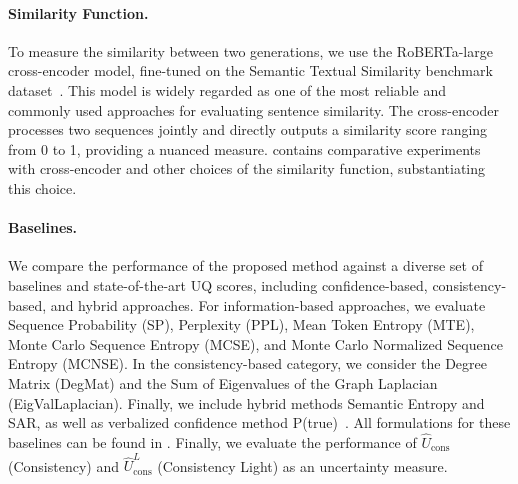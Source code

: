 \paragraph{Similarity Function.}
To measure the similarity between two generations, we use the RoBERTa-large cross-encoder model, fine-tuned on the Semantic Textual Similarity benchmark dataset~\cite{liu2019roberta,reimers2019sentence,cer2017semeval}. This model is widely regarded as one of the most reliable and commonly used approaches for evaluating sentence similarity. The cross-encoder processes two sequences jointly and directly outputs a similarity score ranging from 0 to 1, providing a nuanced measure.  contains comparative experiments with cross-encoder and other choices of the similarity function, substantiating this choice.

\paragraph{Baselines.}
We compare the performance of the proposed method against a diverse set of baselines and state-of-the-art UQ scores, including confidence-based, consistency-based, and hybrid approaches. For information-based approaches, we evaluate Sequence Probability (SP), Perplexity (PPL), Mean Token Entropy (MTE), Monte Carlo Sequence Entropy (MCSE), and Monte Carlo Normalized Sequence Entropy (MCNSE). In the consistency-based category, we consider the Degree Matrix (DegMat) and the Sum of Eigenvalues of the Graph Laplacian (EigValLaplacian). Finally, we include hybrid methods Semantic Entropy and SAR, as well as verbalized confidence method P(true)~\cite{kadavath2022language}. All formulations for these baselines can be found in . Finally, we evaluate the performance of $\hat{U}_{\mathrm{cons}}$ (Consistency) and $\hat{U}^{L}_{\mathrm{cons}}$ (Consistency Light) as an uncertainty measure.

